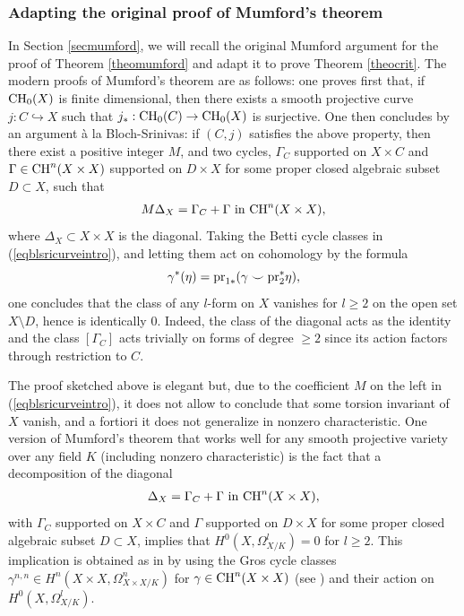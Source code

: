 \documentclass[10pt]{article}
\begin{document}
\subsubsection{Adapting the original proof of Mumford's theorem \label{secintromu}}
In Section \ref{secmumford}, we will recall the original  Mumford argument for the proof of   Theorem \ref{theomumford} and adapt it to prove Theorem \ref{theocrit}.
 The modern proofs of Mumford's theorem  are as follows:  one proves first that, if ${\rm CH}_0(X)$ is finite dimensional, then there exists a smooth projective curve $j:C\hookrightarrow  X$ such that $j_*: {\rm CH}_0(C)\rightarrow {\rm CH}_0(X)$ is surjective. One then concludes by an argument \`{a} la Bloch-Srinivas: if $(C,j)$ satisfies the above property, then there exist a
positive integer $M$, and two  cycles, $\Gamma_C$ supported on $X\times C$  and  $\Gamma\in {\rm CH}^n(X\times X)$  supported on $D\times  X$ for some proper closed algebraic subset $D\subset X$, such that
\begin{eqnarray}\label{eqblsricurveintro} M\Delta_X=\Gamma_C+\Gamma \,\,{\rm in}\,\,{\rm CH}^n(X\times X),
\end{eqnarray}
where $\Delta_X\subset X\times X$ is the diagonal.
Taking  the  Betti cycle classes in (\ref{eqblsricurveintro}), and letting them act on cohomology by the formula $$\gamma^*(\eta)={\rm pr}_{1*}(\gamma\smile {\rm pr}_2^*\eta),$$ one concludes
that the class of  any $l$-form on $X$ vanishes  for $l\geq2$  on the open set $X\setminus D$, hence is identically $0$. Indeed, the class of the diagonal acts as the identity and the class $[\Gamma_C]$ acts trivially on forms of degree $\geq 2$ since its  action factors through restriction to $C$.

The proof sketched above is elegant but, due to the coefficient  $M$ on the left in (\ref{eqblsricurveintro}), it does not allow to conclude that some torsion invariant of $X$ vanish, and a fortiori it does not generalize in nonzero characteristic. One version of Mumford's theorem  that  works well for any smooth projective variety over any field $K$ (including nonzero  characteristic) is the fact that a decomposition of the diagonal
\begin{eqnarray}\label{eqblsricurveintrosasnM} \Delta_X=\Gamma_C+\Gamma \,\,{\rm in}\,\,{\rm CH}^n(X\times X),
\end{eqnarray}
with  $\Gamma_C$ supported on $X\times C$ and  $\Gamma $ supported on $D\times  X$ for some proper closed algebraic subset $D\subset X$, implies that $H^0(X,\Omega_{X/K}^l)=0$ for $l\geq 2$. This implication is obtained as in \cite{totaro} by using the Gros cycle classes
$\gamma^{n,n}\in H^n(X\times X,\Omega_{X\times X/K}^{n})$  for $\gamma\in {\rm CH}^n(X\times X)$ (see \cite{gros}) and their action on $H^0(X,\Omega_{X/K}^l)$.
\end{document}
